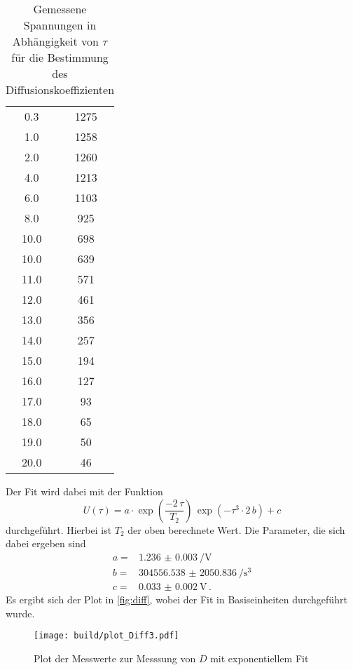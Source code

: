 \begin{table}
    \centering
    \caption{Gemessene Spannungen in Abhängigkeit von $\tau$ für die Bestimmung des Diffusionskoeffizienten}
    \label{tab:diff}
    \begin{tabular}{S[table-format=2.1] S[table-format=4.0]}
        \toprule
        \tableSI{\tau}{\milli\second} &   \\
         & 1275 \\
        1.0 & 1258 \\
        2.0 & 1260 \\
        4.0 & 1213 \\
        6.0 & 1103 \\
        8.0 & 925 \\
        10.0 & 698 \\
        10.0 & 639 \\
        11.0 & 571 \\
        12.0 & 461 \\
        13.0 & 356 \\
        14.0 & 257 \\
        15.0 & 194 \\
        16.0 & 127 \\
        17.0 & 93 \\
        18.0 & 65 \\
        19.0 & 50 \\
        20.0 & 46 \\
        \bottomrule
    \end{tabular}
\end{table}

Der Fit wird dabei mit der Funktion 
\begin{equation}
    U(\tau) = a \cdot \exp(\frac{- 2\,  \tau}{T_2}) \, \exp(- \tau ^3 \cdot 2 \, b) + c 
    \label{eq:fit_d}
\end{equation}
durchgeführt.
Hierbei ist $T_2$ der oben berechnete Wert.
Die Parameter, die sich dabei ergeben sind 
\begin{align*}
    a =& \SI{1.236(3)}{\per\volt} \\
    b =& \SI{304556.538(2050836)}{\per\cubic\second} \\
    c =& \SI{0.033(2)}{\volt} \, .
\end{align*}
Es ergibt sich der Plot in \autoref{fig:diff}, wobei der Fit in Basiseinheiten durchgeführt wurde.
\begin{figure}
    \centering
    \texttt{[image: build/plot\_Diff3.pdf]}
    \caption{Plot der Messwerte zur Messsung von $D$ mit exponentiellem Fit}
    \label{fig:diff}
\end{figure}

